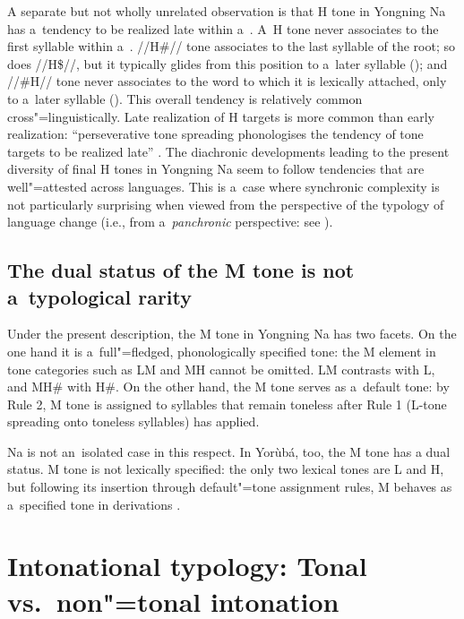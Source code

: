 A separate but not wholly unrelated observation is that H tone in Yongning Na has a~tendency to be realized late within a~. A~H tone never associates to the first syllable within a~. \mbox{//H\#//} tone associates to the last syllable of the root; so does \mbox{//H\$//}, but it typically glides from this position to a~later syllable (); and \mbox{//\#H//} tone never associates to the word to which it is lexically attached, only to a~later syllable (). This overall tendency is relatively common cross"=linguistically. Late realization of H targets is more common than early realization: ``perseverative tone spreading phonologises the tendency of tone targets to be realized late'' \citep[19]{hyman2007d}. The {diachronic} developments leading to the present diversity of final H tones in Yongning Na seem to follow tendencies that are well"=attested across languages. This is a~case where synchronic complexity is not particularly surprising when viewed from the perspective of the typology of language change (i.e., from a~\textit{panchronic} perspective: see ).

\subsection{The dual status of the M tone is not a~typological rarity}
\label{sec:thestatusofmtone}

Under the present description, the M tone in Yongning Na has two facets. On the one hand it is a~full"=fledged, phonologically specified tone: the M element in tone categories such as LM and MH cannot be omitted. LM contrasts with L, and MH\# with H\#. On the other hand, the M tone serves as a~default tone: by Rule 2, M tone is assigned to syllables that remain toneless after Rule 1 (L-tone spreading onto toneless syllables) has applied. 

Na is not an~isolated case in this respect. In
Yorùbá, too, the M tone has a dual status. M tone is not lexically specified: the only two lexical tones are L and H,
but following its insertion through default"=tone assignment rules, M behaves as a~specified
tone in derivations \citep{akinlabi1985}. 


\section[Tonal vs.\ non"=tonal intonation]{Intonational typology: Tonal vs.\ non"=tonal intonation}
\label{sec:intonationaltypology}

